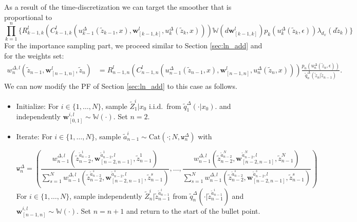 \documentclass[english,13pt]{article}
\numberwithin{equation}{section}
\begin{document}
As a result of the time-discretization we can target the smoother that is proportional to
$$
\prod_{k=1}^n\Big\{ 
R_{k-1,k}^l(C_{k-1,k}^l(u_{k-1}^{\Delta}(\widetilde{z}_{k-1},x),\mathbf{w}_{[k-1,k]}^l,u_k^{\Delta}(\widetilde{z}_k,x)))
\mathbb{W}(d\mathbf{w}_{[k-1,k]}^l)
p_k(u_k^{\Delta}(\widetilde{z}_k,\epsilon))\lambda_{d_x}(d\widetilde{z}_k)
\Big\}%
$$
For the importance sampling part, we proceed similar to Section \ref{sec:ln_add} and for the weights set:
\begin{align*}
w_n^{\Delta,l}(\widetilde{z}_{n-1},\mathbf{w}_{[n-1,n]}^l,\widetilde{z}_n)&  = 
R_{n-1,n}^l(C_{n-1,n}^l(u_{n-1}^{\Delta}(\widetilde{z}_{n-1},x),\mathbf{w}_{[n-1,n]}^l,u_n^{\Delta}(\widetilde{z}_n,x)))
\frac{
p_n(u_n^{\Delta}(\widetilde{z}_n,\epsilon))}%
{\widetilde{q}_n^{\Delta}(\widetilde{z}_n|\widetilde{z}_{n-1})}.
\end{align*}
We can now modify the PF of Section \ref{sec:ln_add} to this case as follows.
\begin{itemize}
\item{Initialize: For $i\in\{1,\dots,N\}$,  sample $\widetilde{Z}_1^i|x_0$ i.i.d.~from $\widetilde{q}_1^{\Delta}(\cdot|x_0)$.
and independently $\mathbf{w}_{[0,1]}^{i,l}\sim\mathbb{W}(\cdot)$.
 Set $n=2$.}
\item{Iterate: For $i\in\{1,\dots,N\}$,  sample $\widetilde{a}_{n-1}^i\sim\text{Cat}(\cdot;N,\mathtt{w}^\Delta_n)$ with

$$\mathtt{w}^\Delta_n=\left(\frac{w_{n-1}^{\Delta,l}(\widetilde{z}_{n-2}^{\widetilde{a}_{n-2}^1}, \mathbf{w}_{[n-2,n-1]}^{\widetilde{a}_{n-2}^1,l},\widetilde{z}_{n-1}^{1})}
{\sum_{s=1}^N w_{n-1}^{\Delta,l}(\widetilde{z}_{n-2}^{\widetilde{a}_{n-2}^s},
\mathbf{w}_{[n-2,n-1]}^{\widetilde{a}_{n-2}^s,l},
\widetilde{z}_{n-1}^s)},\ldots,
\frac{w_{n-1}^{\Delta,l}(\widetilde{z}_{n-2}^{\widetilde{a}_{n-2}^N}, \mathbf{w}_{[n-2,n-1]}^{\widetilde{a}_{n-2}^N,l},\widetilde{z}_{n-1}^{N})}
{\sum_{s=1}^N w_{n-1}^{\Delta,l}(\widetilde{z}_{n-2}^{\widetilde{a}_{n-2}^s},
\mathbf{w}_{[n-2,n-1]}^{\widetilde{a}_{n-2}^s,l},
\widetilde{z}_{n-1}^s)}
\right)$$
%
%
For $i\in\{1,\dots,N\}$,  sample independently $\widetilde{Z}_n^i|\widetilde{z}_{n-1}^{\widetilde{a}_{n-1}^i}$  from $\widetilde{q}_n^{\Delta}(\cdot|\widetilde{z}_{n-1}^{\widetilde{a}_{n-1}^i})$
and $\mathbf{w}_{[n-1,n]}^{i,l}\sim\mathbb{W}(\cdot)$.
Set $n=n+1$ and return to the start of the bullet point.}
\end{itemize}
\end{document}
